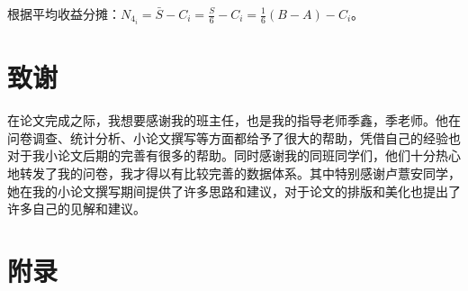 \documentclass[lang=cn,a4paper]{elegantpaper}
\begin{document}
    根据平均收益分摊：$\displaystyle N_{4_i}=\bar{S}-C_i=\frac{S}{6}-C_i=\frac{1}{6}(B-A)-C_i$。

    \section*{致谢}
    在论文完成之际，我想要感谢我的班主任，也是我的指导老师季鑫，季老师。他在问卷调查、统计分析、小论文撰写等方面都给予了很大的帮助，凭借自己的经验也对于我小论文后期的完善有很多的帮助。同时感谢我的同班同学们，他们十分热心地转发了我的问卷，我才得以有比较完善的数据体系。其中特别感谢卢薏安同学，她在我的小论文撰写期间提供了许多思路和建议，对于论文的排版和美化也提出了许多自己的见解和建议。
    
    \clearpage

    
    
    \clearpage
    
    \section*{附录}
    \appendix
 
\end{document}
